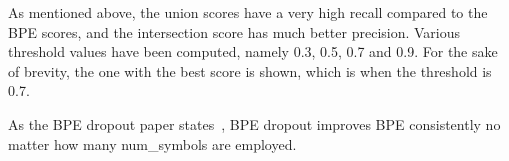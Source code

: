 As mentioned above, the union scores have a very high recall compared to the BPE scores, and the intersection score has much better precision. Various threshold values have been computed, namely 0.3, 0.5, 0.7 and 0.9. For the sake of brevity, the one with the best score is shown, which is when the threshold is 0.7.


As the BPE dropout paper states~\cite{provilkov2019bpedropout}, BPE dropout improves BPE consistently no matter how many num\_symbols are employed.

